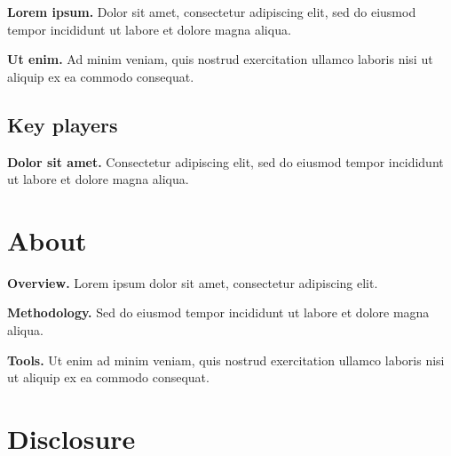 \documentclass[11pt]{article}
\begin{document}
\textbf{Lorem ipsum.} Dolor sit amet, consectetur adipiscing elit, sed do eiusmod tempor incididunt ut labore et dolore magna aliqua.

\textbf{Ut enim.} Ad minim veniam, quis nostrud exercitation ullamco laboris nisi ut aliquip ex ea commodo consequat.

\subsection*{Key players}

\textbf{Dolor sit amet.} Consectetur adipiscing elit, sed do eiusmod tempor incididunt ut labore et dolore magna aliqua.

\section*{About}

\textbf{Overview.} Lorem ipsum dolor sit amet, consectetur adipiscing elit.

\textbf{Methodology.} Sed do eiusmod tempor incididunt ut labore et dolore magna aliqua.

\textbf{Tools.} Ut enim ad minim veniam, quis nostrud exercitation ullamco laboris nisi ut aliquip ex ea commodo consequat.

\section*{Disclosure}

\lipsum[11]
\end{document}
